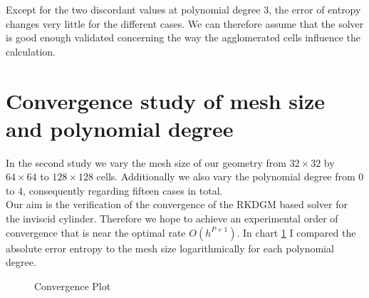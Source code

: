 	Except for the two discordant values at polynomial degree $3$, the error of entropy changes very little for the different cases. We can therefore assume that the solver is good enough validated concerning the way the agglomerated cells influence the calculation. 
	
	\section{Convergence study of mesh size and polynomial degree}
	
	In the second study we vary the mesh size of our geometry from $32 \times 32$ by $64 \times 64$ to $128 \times 128$ cells. Additionally we also vary the polynomial degree from $0$ to $4$, consequently regarding fifteen cases in total. \\
	Our aim is the verification of the convergence of the RKDGM based solver for the inviscid cylinder. Therefore we hope to achieve an experimental order of convergence that is near the optimal rate $O(h^{P+1})$. In chart \ref{mesherror} I compared the absolute error entropy to the mesh size logarithmically for each polynomial degree. 	
	\begin{figure}[htp]
		\centering		
		\label{mesherror}	
		\caption{Convergence Plot}
	\end{figure}

